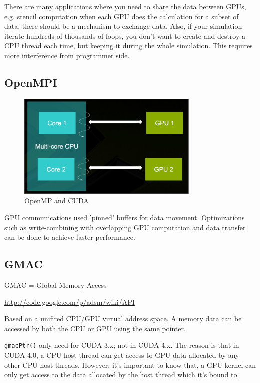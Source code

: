 There are many applications where you need to share the data between GPUs, e.g.
stencil computation when each GPU does the calculation for a subset of data,
there should be a mechanism to exchange data. Also, if your simulation iterate
hundreds of thousands of loops, you don't want to create and destroy a CPU
thread each time, but keeping it during the whole simulation. This requires more
interference from programmer side. 

\subsection{OpenMPI}
\label{sec:GPUs_openMPI}


\begin{figure}[hbt]
  \centerline{\includegraphics[height=5cm,
    angle=0]{./images/OpenMP_GPU.eps}}
\caption{OpenMP and CUDA}
\label{fig:OpenMP_GPU}
\end{figure}

GPU communications used 'pinned' buffers for data movement. Optimizations such
as write-combining with overlapping GPU computation and data transfer can be
done to achieve faster performance. 


\subsection{GMAC}
\label{sec:GPUs_gmac}

GMAC = Global Memory Access 

\url{http://code.google.com/p/adsm/wiki/API}

Based on a unifired CPU/GPU virtual address space. A memory data can
be accessed by both the CPU or GPU using the same pointer. 


\verb!gmacPtr()! only need for CUDA 3.x; not in CUDA 4.x. The reason
is that in CUDA 4.0, a CPU host thread can get access to GPU data
allocated by any other CPU host threads. However, it's important to
know that, a GPU kernel can only get access to the data allocated by
the host thread which it's bound to.

